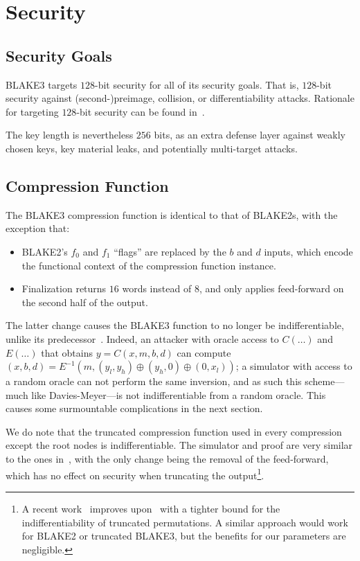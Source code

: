 \documentclass[11pt,notitlepage,a4paper]{article}
\begin{document}
\section{Security}\label{sec:security}

\subsection{Security Goals}\label{sec:goals}

BLAKE3 targets $128$-bit security for all of its security goals. That
is, $128$-bit security against (second-)preimage, collision, or
differentiability attacks. 
Rationale for targeting $128$-bit security can be found
in~\cite[\S2]{TMC}.

The key length is nevertheless $256$ bits, as an extra defense layer
against weakly chosen keys, key material leaks, and potentially
multi-target attacks.


\subsection{Compression Function}\label{sec:compressindiff}

The BLAKE3 compression function is identical to that of BLAKE2s, with
the exception that:

\begin{itemize}
  \item BLAKE2's $f_0$ and $f_1$ ``flags'' are replaced by the $b$ and $d$ inputs, which
  encode the functional context of the compression function instance.
  \item Finalization returns $16$ words instead of $8$, and only applies feed-forward on the second half of the output.
\end{itemize}

The latter change causes the BLAKE3 function to no longer be indifferentiable, unlike its predecessor~\cite{DBLP:journals/tosc/LuykxMN16}. Indeed, an attacker with oracle access to $C(\dots)$ and $E(\dots)$ that obtains $y = C(x, m, b, d)$ can compute $(x, b, d) = E^{-1}(m, (y_l, y_h) \oplus (y_h, 0) \oplus (0, x_l))$; a simulator with access to a random oracle can not perform the same inversion, and as such this scheme---much like Davies-Meyer---is not indifferentiable from a random oracle. This causes some surmountable complications in the next section.

We do note that the truncated compression function used in every compression except the root nodes is indifferentiable. The simulator and proof are very similar to the ones in~\cite{DBLP:journals/tosc/LuykxMN16}, with the only change being the removal of the feed-forward, which has no effect on security when truncating the output\footnote{A recent work~\cite{DBLP:conf/asiacrypt/ChoiLL19} improves upon~\cite{DBLP:conf/fse/DodisRRS09,DBLP:journals/tosc/LuykxMN16} with a tighter bound for the indifferentiability of truncated permutations. A similar approach would work for BLAKE2 or truncated BLAKE3, but the benefits for our parameters are negligible.}.
\end{document}
